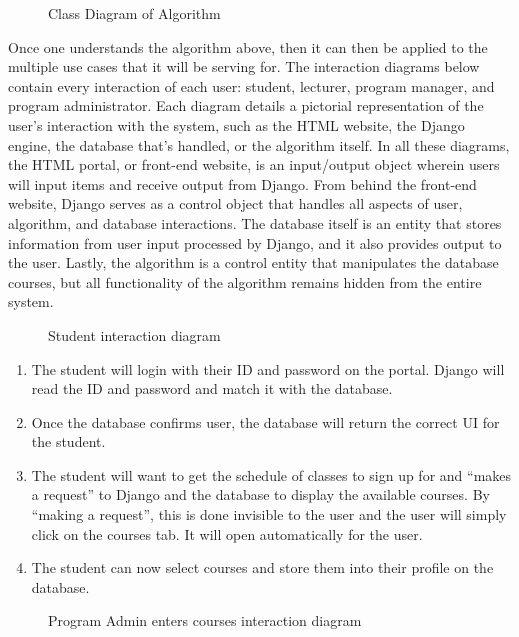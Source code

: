 \documentclass[12pt,article]{memoir}
\begin{document}
\begin{figure}[htb]
\caption{Class Diagram of Algorithm}
\end{figure}

Once one understands the algorithm above, then it can then be applied to the multiple use cases that it will be serving for. The interaction diagrams below contain every interaction of each user: student, lecturer, program manager, and program administrator. Each diagram details a pictorial representation of the user’s interaction with the system, such as the HTML website, the Django engine, the database that’s handled, or the algorithm itself.  In all these diagrams, the HTML portal, or front-end website, is an input/output object wherein users will input items and receive output from Django. From behind the front-end website, Django serves as a control object that handles all aspects of user, algorithm, and database interactions. The database itself is an entity that stores information from user input processed by Django, and it also provides output to the user. Lastly, the algorithm is a control entity that manipulates the database courses, but all functionality of the algorithm remains hidden from the entire system. 

\begin{figure}[htb]
\caption{Student interaction diagram}
\end{figure}

\begin{enumerate}
\item The student will login with their ID and password on the portal. Django will read the ID and password and match it with the database. 
\item Once the database confirms user, the database will return the correct UI for the student.
\item The student will want to get the schedule of classes to sign up for and “makes a request” to Django and the database to display the available courses. By “making a request”, this is done invisible to the user and the user will simply click on the courses tab. It will open automatically for the user. 
\item The student can now select courses and store them into their profile on the database. 
\end{enumerate}

\begin{figure}[htb]
\caption{Program Admin enters courses interaction diagram}
\end{figure}
\end{document}
